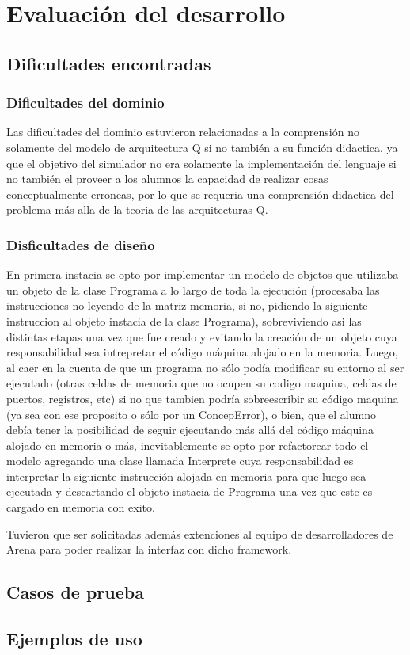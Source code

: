 \chapter{Evaluación del desarrollo}

\section{Dificultades encontradas}

\subsection{Dificultades del dominio}
Las dificultades del dominio estuvieron relacionadas a la comprensión no solamente del modelo de arquitectura Q si no también a su función didactica, ya que el objetivo del simulador no era solamente la implementación del lenguaje si no también el proveer a los alumnos la capacidad de realizar cosas conceptualmente erroneas, por lo que se requeria una comprensión didactica del problema más alla de la teoria de las arquitecturas Q. 


\subsection{Disficultades de diseño}
En primera instacia se opto por implementar un modelo de objetos que utilizaba un objeto de la clase Programa a lo largo de toda la ejecución (procesaba las instrucciones no leyendo de la matriz memoria, si no, pidiendo la siguiente instruccion al objeto instacia de la clase Programa), sobreviviendo asi las distintas etapas una vez que fue creado y evitando la creación de un objeto cuya responsabilidad sea intrepretar el código máquina alojado en la memoria. Luego, al caer en la cuenta de que un programa no sólo podía modificar su entorno al ser ejecutado (otras celdas de memoria que no ocupen su codigo maquina, celdas de puertos, registros, etc) si no que tambien podría sobreescribir su código maquina (ya sea con ese proposito o sólo por un ConcepError), o bien, que el alumno debía tener la posibilidad de seguir ejecutando más allá del código máquina alojado en memoria o más, inevitablemente se opto por refactorear todo el modelo agregando una clase llamada Interprete cuya responsabilidad es interpretar la siguiente instrucción alojada en memoria para que luego sea ejecutada y descartando el objeto instacia de Programa una vez que este es cargado en memoria con exito.

Tuvieron que ser solicitadas además extenciones al equipo de desarrolladores de Arena para poder realizar la interfaz con dicho framework.

\section{Casos de prueba}

\section{Ejemplos de uso}